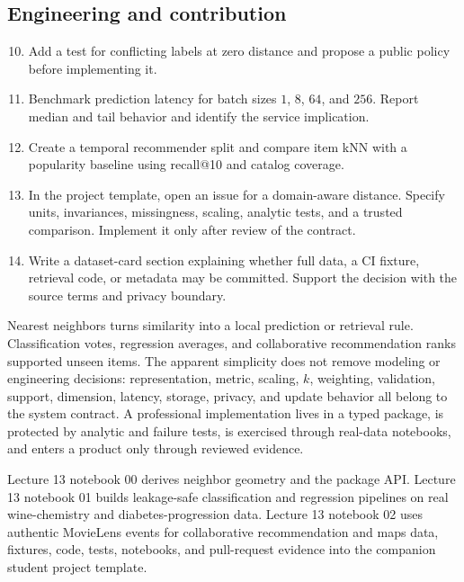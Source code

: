 \subsection*{Engineering and contribution}
\begin{enumerate}
  \setcounter{enumi}{9}
  \item Add a test for conflicting labels at zero distance and propose a public
  policy before implementing it.
  \item Benchmark prediction latency for batch sizes $1$, $8$, $64$, and $256$.
  Report median and tail behavior and identify the service implication.
  \item Create a temporal recommender split and compare item kNN with a
  popularity baseline using recall@10 and catalog coverage.
  \item In the project template, open an issue for a domain-aware distance.
  Specify units, invariances, missingness, scaling, analytic tests, and a
  trusted comparison. Implement it only after review of the contract.
  \item Write a dataset-card section explaining whether full data, a CI fixture,
  retrieval code, or metadata may be committed. Support the decision with the
  source terms and privacy boundary.
\end{enumerate}

\begin{chapterreview}
Nearest neighbors turns similarity into a local prediction or retrieval rule.
Classification votes, regression averages, and collaborative recommendation
ranks supported unseen items. The apparent simplicity does not remove modeling
or engineering decisions: representation, metric, scaling, $k$, weighting,
validation, support, dimension, latency, storage, privacy, and update behavior
all belong to the system contract. A professional implementation lives in a
typed package, is protected by analytic and failure tests, is exercised through
real-data notebooks, and enters a product only through reviewed evidence.
\end{chapterreview}

\begin{notebooklink}
Lecture 13 notebook 00 derives neighbor geometry and the package API.
Lecture 13 notebook 01 builds leakage-safe classification and regression pipelines on
real wine-chemistry and diabetes-progression data.
Lecture 13 notebook 02 uses
authentic MovieLens events for collaborative recommendation and maps data,
fixtures, code, tests, notebooks, and pull-request evidence into the companion
student project template.
\end{notebooklink}
